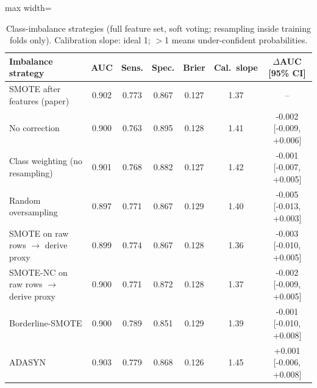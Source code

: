 \begin{table}[!t]
\centering
\scriptsize
\caption{Class-imbalance strategies (full feature set, soft voting; resampling inside training folds only). Calibration slope: ideal 1; $>$1 means under-confident probabilities.}
\label{tab:e3}
\setlength{\tabcolsep}{3pt}
\begin{adjustbox}{max width=\linewidth}
\begin{tabular}{lcccccc}
\toprule
Imbalance strategy & AUC & Sens. & Spec. & Brier & Cal.\ slope & $\Delta$AUC [95\% CI] \\
\midrule
SMOTE after features (paper) & 0.902 & 0.773 & 0.867 & 0.127 & 1.37 & -- \\
No correction & 0.900 & 0.763 & 0.895 & 0.128 & 1.41 & -0.002 [-0.009, +0.006] \\
Class weighting (no resampling) & 0.901 & 0.768 & 0.882 & 0.127 & 1.42 & -0.001 [-0.007, +0.005] \\
Random oversampling & 0.897 & 0.771 & 0.867 & 0.129 & 1.40 & -0.005 [-0.013, +0.003] \\
SMOTE on raw rows $\rightarrow$ derive proxy & 0.899 & 0.774 & 0.867 & 0.128 & 1.36 & -0.003 [-0.010, +0.005] \\
SMOTE-NC on raw rows $\rightarrow$ derive proxy & 0.900 & 0.771 & 0.872 & 0.128 & 1.37 & -0.002 [-0.009, +0.005] \\
Borderline-SMOTE & 0.900 & 0.789 & 0.851 & 0.129 & 1.39 & -0.001 [-0.010, +0.008] \\
ADASYN & 0.903 & 0.779 & 0.868 & 0.126 & 1.45 & +0.001 [-0.006, +0.008] \\
\bottomrule
\end{tabular}
\end{adjustbox}
\end{table}
